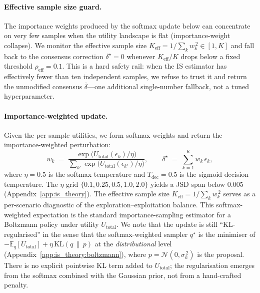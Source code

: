 \documentclass{article}
\begin{document}
\paragraph{Effective sample size guard.}
The importance weights produced by the softmax update below can concentrate
on very few samples when the utility landscape is flat
(importance-weight collapse). We monitor the effective sample size
$K_{\text{eff}} = 1\big/\sum_{k}w_k^{\,2}\in[1,K]$ and fall back to the
consensus correction $\delta^{\star}=0$ whenever $K_{\text{eff}}/K$ drops
below a fixed threshold $\rho_{\text{eff}}=0.1$. This is a hard safety rail:
when the IS estimator has effectively fewer than ten independent samples, we
refuse to trust it and return the unmodified consensus
$\bar{\delta}$---one additional single-number fallback, not a tuned
hyperparameter.

\paragraph{Importance-weighted update.}
Given the per-sample utilities, we form softmax weights and return the
importance-weighted perturbation:
\begin{equation}
  w_k \;=\; \frac{\exp\!\bigl(U_{\text{total}}(\epsilon_k)/\eta\bigr)}
                 {\sum_{k'}\exp\!\bigl(U_{\text{total}}(\epsilon_{k'})/\eta\bigr)},
  \qquad
  \delta^{\star} \;=\; \sum_{k=1}^{K} w_k\,\epsilon_k,
  \label{eq:is_update}
\end{equation}
where $\eta = 0.5$ is the softmax temperature and $T_{\text{dec}} = 0.5$ is the
sigmoid decision temperature. The $\eta$ grid
$\{0.1,0.25,0.5,1.0,2.0\}$ yields a JSD span below $0.005$
(Appendix~\ref{app:is_theory}). The effective sample size
$K_{\text{eff}} = 1/\sum_k w_k^{\,2}$ serves as a per-scenario diagnostic of
the exploration--exploitation balance.
This softmax-weighted expectation is the standard importance-sampling estimator
for a Boltzmann policy under utility $U_{\text{total}}$.
We note that the update is still ``KL-regularised'' in the sense that the
softmax-weighted sampler $q^{\star}$ is the minimiser of
$-\mathbb{E}_{q}[U_{\text{total}}]+\eta\,\mathrm{KL}(q\,\|\,p)$ at the
\emph{distributional} level (Appendix~\ref{app:is_theory:boltzmann}), where
$p=\mathcal{N}(0,\sigma_k^{\,2})$ is the proposal. There is no explicit
pointwise KL term added to $U_{\text{total}}$; the regularisation emerges
from the softmax combined with the Gaussian prior, not from a hand-crafted
penalty.
\end{document}

